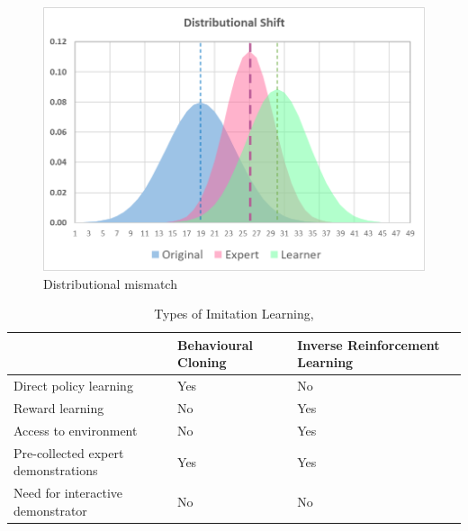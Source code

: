 \documentclass{article}
\begin{document}
\begin{figure}
\centering
\includegraphics[width=0.6\linewidth]{images/DistributionalShift.png}
\caption{Distributional mismatch}
\label{fig:BCprob}
\end{figure}

%

\begingroup
\setlength{\tabcolsep}{6pt}
\begin{table}[h!]
\centering
\renewcommand{\arraystretch}{1.5} 
\begin{tabular}{L{6cm} L{3cm} L{3cm}}
	\midrule[0.01pt]
	& \textbf{Behavioural Cloning} & \textbf{Inverse Reinforcement Learning}\\
	\midrule[0.01pt]
	Direct policy learning & Yes & No \\
	Reward learning & No & Yes \\
	Access to environment & No & Yes \\
	Pre-collected expert demonstrations & Yes & Yes \\
	Need for interactive demonstrator & No & No \\
	\midrule[0.01pt]
\end{tabular}
\caption{Types of Imitation Learning, \cite{yue2018imitation}}
\label{tbl:BC_IRL}
\end{table}
\endgroup
\end{document}
